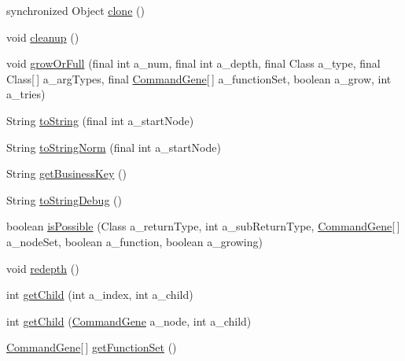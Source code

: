 \begin{DoxyCompactItemize}
\item 
synchronized Object \hyperlink{classorg_1_1jgap_1_1gp_1_1impl_1_1_program_chromosome_af25451cf53447cdec834e5be9ac77f79}{clone} ()
\item 
void \hyperlink{classorg_1_1jgap_1_1gp_1_1impl_1_1_program_chromosome_a274fc584475b32253ee2ced3897e7547}{cleanup} ()
\item 
void \hyperlink{classorg_1_1jgap_1_1gp_1_1impl_1_1_program_chromosome_a6b798831e4e59f1dbcd58381e090a9d0}{grow\-Or\-Full} (final int a\-\_\-num, final int a\-\_\-depth, final Class a\-\_\-type, final Class\mbox{[}$\,$\mbox{]} a\-\_\-arg\-Types, final \hyperlink{classorg_1_1jgap_1_1gp_1_1_command_gene}{Command\-Gene}\mbox{[}$\,$\mbox{]} a\-\_\-function\-Set, boolean a\-\_\-grow, int a\-\_\-tries)
\item 
String \hyperlink{classorg_1_1jgap_1_1gp_1_1impl_1_1_program_chromosome_addf578c58866aaf237a11d91308d0c04}{to\-String} (final int a\-\_\-start\-Node)
\item 
String \hyperlink{classorg_1_1jgap_1_1gp_1_1impl_1_1_program_chromosome_a56c22c94166729d37888a6daaef76bb3}{to\-String\-Norm} (final int a\-\_\-start\-Node)
\item 
String \hyperlink{classorg_1_1jgap_1_1gp_1_1impl_1_1_program_chromosome_a88f1eb9dac4272ec7f7274f0cd66d763}{get\-Business\-Key} ()
\item 
String \hyperlink{classorg_1_1jgap_1_1gp_1_1impl_1_1_program_chromosome_a145081f4837b9a7b50af35f8256c0eea}{to\-String\-Debug} ()
\item 
boolean \hyperlink{classorg_1_1jgap_1_1gp_1_1impl_1_1_program_chromosome_a171447ec4020a6ca9f4e089836147993}{is\-Possible} (Class a\-\_\-return\-Type, int a\-\_\-sub\-Return\-Type, \hyperlink{classorg_1_1jgap_1_1gp_1_1_command_gene}{Command\-Gene}\mbox{[}$\,$\mbox{]} a\-\_\-node\-Set, boolean a\-\_\-function, boolean a\-\_\-growing)
\item 
void \hyperlink{classorg_1_1jgap_1_1gp_1_1impl_1_1_program_chromosome_a72e5e8ab3c253f4ec7dc10fb17a45180}{redepth} ()
\item 
int \hyperlink{classorg_1_1jgap_1_1gp_1_1impl_1_1_program_chromosome_aae34fa625e78f8be2de585462d3bbcf8}{get\-Child} (int a\-\_\-index, int a\-\_\-child)
\item 
int \hyperlink{classorg_1_1jgap_1_1gp_1_1impl_1_1_program_chromosome_a885c955a0bb1f22ad404c242d51cba45}{get\-Child} (\hyperlink{classorg_1_1jgap_1_1gp_1_1_command_gene}{Command\-Gene} a\-\_\-node, int a\-\_\-child)
\item 
\hyperlink{classorg_1_1jgap_1_1gp_1_1_command_gene}{Command\-Gene}\mbox{[}$\,$\mbox{]} \hyperlink{classorg_1_1jgap_1_1gp_1_1impl_1_1_program_chromosome_a8640ae6ff64b6b0fe5d0972a554104f0}{get\-Function\-Set} ()

\end{DoxyCompactItemize}
